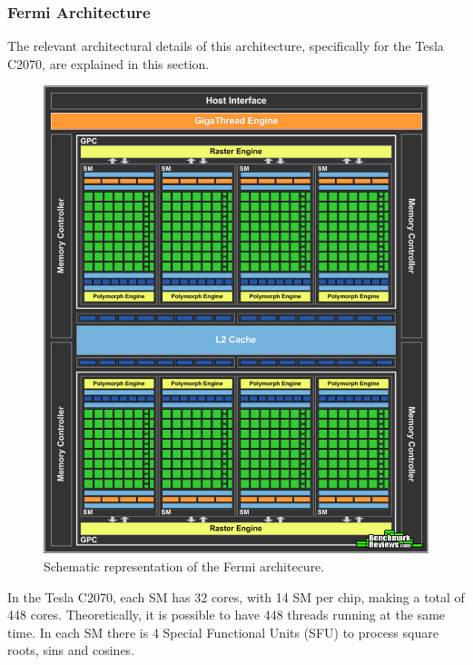 \subsubsection{\nvidia Fermi Architecture}

The relevant architectural details of this architecture, specifically for the Tesla C2070, are explained in this section.

\begin{figure}[!htp]
	\begin{center}
		\includegraphics[scale=0.25]{../../common/img/fermi_arch.png}
		\caption{Schematic representation of the \nvidia Fermi architecure.}
		\label{fig:fermi}
	\end{center}
\end{figure}

In the Tesla C2070, each SM has 32 \cuda cores, with 14 SM per chip, making a total of 448 \cuda cores. Theoretically, it is possible to have 448 \cuda threads running at the same time. In each SM there is 4 Special Functional Units (SFU) to process square roots, sins and cosines.

